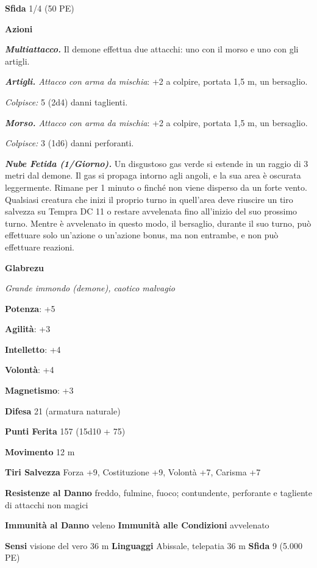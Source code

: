 \begin{multicols}{2}
\textbf{Sfida} 1/4 (50 PE)

\textbf{Azioni}

\emph{\textbf{Multiattacco.}} Il demone effettua due attacchi: uno con
il morso e uno con gli artigli.

\emph{\textbf{Artigli.} Attacco con arma da mischia}: +2 a colpire,
portata 1,5 m, un bersaglio.

\emph{Colpisce:} 5 (2d4) danni taglienti.

\emph{\textbf{Morso.} Attacco con arma da mischia}: +2 a colpire,
portata 1,5 m, un bersaglio.

\emph{Colpisce:} 3 (1d6) danni perforanti.

\emph{\textbf{Nube Fetida (1/Giorno).}} Un disgustoso gas verde si
estende in un raggio di 3 metri dal demone. Il gas si propaga intorno
agli angoli, e la sua area è oscurata leggermente. Rimane per 1 minuto o
finché non viene disperso da un forte vento. Qualsiasi creatura che
inizi il proprio turno in quell'area deve riuscire un tiro salvezza su Tempra DC 11 o restare avvelenata fino all'inizio del suo prossimo
turno. Mentre è avvelenato in questo modo, il bersaglio, durante il suo
turno, può effettuare solo un'azione o un'azione bonus, ma non entrambe,
e non può effettuare reazioni.



\textbf{Glabrezu}

\emph{Grande immondo (demone), caotico malvagio}

\textbf{Potenza}: +5

\textbf{Agilità}: +3

\textbf{Intelletto}: +4

\textbf{Volontà}: +4

\textbf{Magnetismo}: +3

\textbf{Difesa} 21 (armatura naturale)

\textbf{Punti Ferita} 157 (15d10 + 75)

\textbf{Movimento} 12 m

\textbf{Tiri Salvezza} Forza +9, Costituzione +9, Volontà +7, Carisma
+7

\textbf{Resistenze al Danno} freddo, fulmine, fuoco; contundente,
perforante e tagliente di attacchi non magici

\textbf{Immunità al Danno} veleno \textbf{Immunità alle Condizioni}
avvelenato

\textbf{Sensi} visione del vero 36 m
\textbf{Linguaggi} Abissale, telepatia 36 m \textbf{Sfida} 9 (5.000 PE)


\end{multicols}
